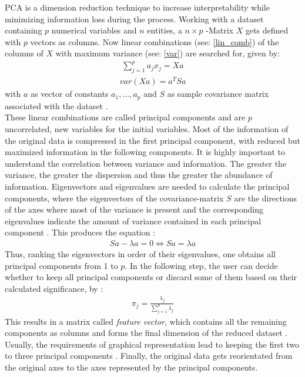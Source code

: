 PCA is a dimension reduction technique to increase interpretability while minimizing information loss during the process. Working with a dataset containing $p$ numerical variables and $n$ entities, a $n\times p$ -Matrix $X$ gets defined with $p$ vectors as columns. Now linear combinations (see: \ref{lin_comb}) of the columns of $X$ with maximum variance (see: \ref{var}) are searched for, given by: 
\begin{align}\label{lin_comb}
    \sum_{j=1}^{p}a_jx_j = Xa
\end{align}
\begin{align}\label{var}
    var(Xa) = a^TSa
\end{align}
with $a$ as vector of constants $a_1,...,a_p$ and $S$ as sample covariance matrix associated with the dataset \cite{pca_beg}.\\
These linear combinations are called principal components and are $p$ uncorrelated, new variables for the initial variables. Most of the information of the original data is compressed in the first principal component, with reduced but maximized information in the following components. It is highly important to understand the correlation between variance and information. The greater the variance, the greater the dispersion and thus the greater the abundance of information. Eigenvectors and eigenvalues are needed to calculate the principal components, where the eigenvectors of the covariance-matrix $S$ are the directions of the axes where most of the variance is present and the corresponding eigenvalues indicate the amount of variance contained in each principal component \cite{pca_step}. This produces the equation \cite{pca_beg}:
\begin{align}
    Sa - \lambda a = 0 \Leftrightarrow Sa = \lambda a
\end{align}
Thus, ranking the eigenvectors in order of their eigenvalues, one obtains all principal components from 1 to $p$. In the following step, the user can decide whether to keep all principal components or discard some of them based on their calculated significance, by \cite{pca_beg}: 
\begin{align}
    \pi_j = \frac{\lambda_j}{\sum_{j=1}^{p}\lambda_j}
\end{align}
This results in a matrix called \textit{feature vector}, which contains all the remaining components as columns and forms the final dimension of the reduced dataset \cite{pca_step}. Usually, the requirements of graphical representation lead to keeping the first two to three principal components \cite{pca_beg}. Finally, the original data gets reorientated from the original axes to the axes represented by the principal components.